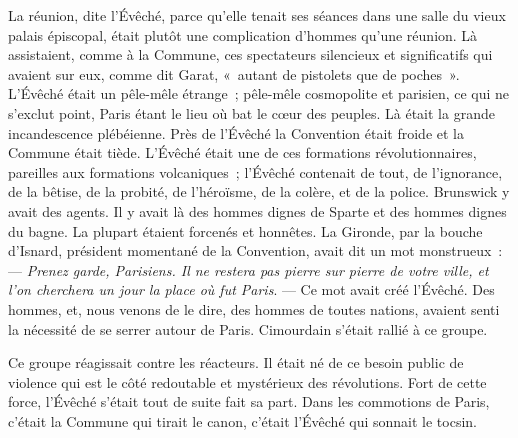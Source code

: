 \documentclass[french,twoside]{book} %
\begin{document}
La réunion, dite l’Évêché, parce qu’elle tenait ses séances dans une salle du vieux palais épiscopal, était plutôt une complication d’hommes qu’une réunion. Là assistaient, comme à la Commune, ces spectateurs silencieux et significatifs qui avaient sur eux, comme dit Garat, « autant de pistolets que de poches ». L’Évêché était un pêle-mêle étrange ; pêle-mêle cosmopolite et parisien, ce qui ne s’exclut point, Paris étant le lieu où bat le cœur des peuples. Là était la grande incandescence plébéienne. Près de l’Évêché la Convention était froide et la Commune était tiède. L’Évêché était une de ces formations révolutionnaires, pareilles aux formations volcaniques ; l’Évêché contenait de tout, de l’ignorance, de la bêtise, de la probité, de l’héroïsme, de la colère, et de la police. Brunswick y avait des agents. Il y avait là des hommes dignes de Sparte et des hommes dignes du bagne. La plupart étaient forcenés et honnêtes. La  Gironde, par la bouche d’Isnard, président momentané de la Convention, avait dit un mot monstrueux : — \emph{Prenez garde, Parisiens. Il ne restera pas pierre sur pierre de votre ville, et l’on cherchera un jour la place où fut Paris}. — Ce mot avait créé l’Évêché. Des hommes, et, nous venons de le dire, des hommes de toutes nations, avaient senti la nécessité de se serrer autour de Paris. Cimourdain s’était rallié à ce groupe.\par
Ce groupe réagissait contre les réacteurs. Il était né de ce besoin public de violence qui est le côté redoutable et mystérieux des révolutions. Fort de cette force, l’Évêché s’était tout de suite fait sa part. Dans les commotions de Paris, c’était la Commune qui tirait le canon, c’était l’Évêché qui sonnait le tocsin.\par
\end{document}
